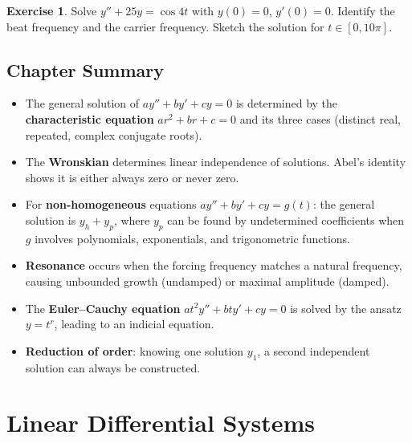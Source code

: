 \documentclass[12pt,a4paper,openany]{book}
\theoremstyle{definition}
\newtheorem{exercise}{Exercise}[chapter]
\theoremstyle{plain}
\theoremstyle{remark}
\begin{document}
\begin{exercise}\label{exer:beats-exercise}
Solve $y'' + 25y = \cos 4t$ with $y(0) = 0$, $y'(0) = 0$.
Identify the beat frequency and the carrier frequency. Sketch the solution
for $t \in [0, 10\pi]$.
\end{exercise}

\section{Chapter Summary}\label{sec:ch4-summary}

\begin{itemize}
  \item The general solution of $ay'' + by' + cy = 0$ is determined by the
    \textbf{characteristic equation} $ar^2 + br + c = 0$ and its three cases
    (distinct real, repeated, complex conjugate roots).
  \item The \textbf{Wronskian} determines linear independence of solutions.
    Abel's identity shows it is either always zero or never zero.
  \item For \textbf{non-homogeneous} equations $ay'' + by' + cy = g(t)$:
    the general solution is $y_h + y_p$, where $y_p$ can be found by
    undetermined coefficients when $g$ involves polynomials, exponentials,
    and trigonometric functions.
  \item \textbf{Resonance} occurs when the forcing frequency matches a natural
    frequency, causing unbounded growth (undamped) or maximal amplitude (damped).
  \item The \textbf{Euler--Cauchy equation} $at^2y'' + bty' + cy = 0$ is solved
    by the ansatz $y = t^r$, leading to an indicial equation.
  \item \textbf{Reduction of order}: knowing one solution $y_1$, a second
    independent solution can always be constructed.
\end{itemize}


\chapter{Linear Differential Systems}\label{ch:linear-systems}
\end{document}
